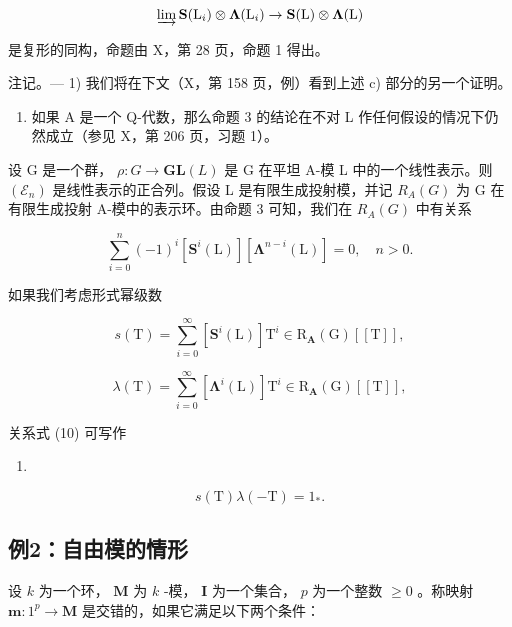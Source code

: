 \[
\varinjlim \mathbf {S} (\mathrm{L} _ {i}) \otimes \boldsymbol {\Lambda} (\mathrm{L} _ {i}) \rightarrow \mathbf {S} (\mathrm{L}) \otimes \boldsymbol {\Lambda} (\mathrm{L})
\]

是复形的同构，命题由 X，第 28 页，命题 1 得出。

注记。--- 1) 我们将在下文（X，第 158 页，例）看到上述 c) 部分的另一个证明。

\begin{enumerate}
\def\labelenumi{\arabic{enumi})}
\setcounter{enumi}{1}
\tightlist
\item
  如果 A 是一个 Q-代数，那么命题 3 的结论在不对 L 作任何假设的情况下仍然成立（参见 X，第 206 页，习题 1）。
\end{enumerate}

设 G 是一个群， \(\rho: G \to \mathbf{GL}(L)\) 是 G 在平坦 A-模 L 中的一个线性表示。则 \((\mathcal{E}_n)\) 是线性表示的正合列。假设 L 是有限生成投射模，并记 \(R_A(G)\) 为 G 在有限生成投射 A-模中的表示环。由命题 3 可知，我们在 \(R_{A}(G)\) 中有关系

\[
\sum_ {i = 0} ^ {n} (- 1) ^ {i} \left[ \mathbf {S} ^ {i} (\mathrm{L}) \right] \left[ \boldsymbol {\Lambda} ^ {n - i} (\mathrm{L}) \right] = 0, \quad n > 0.\tag{10}
\]

如果我们考虑形式幂级数

\[
s (\mathrm{T}) = \sum_ {i = 0} ^ {\infty} \left[ \mathbf {S} ^ {i} (\mathrm{L}) \right] \mathrm{T} ^ {i} \in \mathrm{R} _ {\mathbf {A}} (\mathrm{G}) [ [ \mathrm{T} ] ],
\]

\[
\lambda (\mathrm{T}) = \sum_ {i = 0} ^ {\infty} \left[ \boldsymbol {\Lambda} ^ {i} (\mathrm{L}) \right] \mathrm{T} ^ {i} \in \mathrm{R} _ {\mathbf {A}} (\mathrm{G}) [ [ \mathrm{T} ] ],
\]

关系式 (10) 可写作

\begin{enumerate}
\def\labelenumi{(\arabic{enumi})}
\setcounter{enumi}{10}
\tightlist
\item
\end{enumerate}

\[
s (\mathrm{T}) \lambda (- \mathrm{T}) = 1 _ {*}.
\]

\subsection{例2：自由模的情形}

设 \(k\) 为一个环， \(\mathbf{M}\) 为 \(k\) -模， \(\mathbf{I}\) 为一个集合， \(p\) 为一个整数 \(\geqslant 0\) 。称映射 \(\boldsymbol{m}:1^{p}\to\mathbf{M}\) 是交错的，如果它满足以下两个条件：

